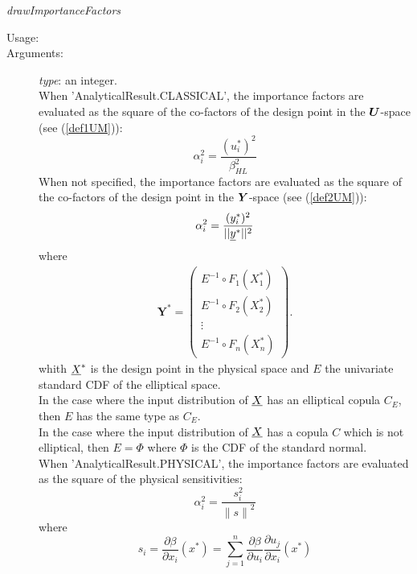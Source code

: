 \begin{description}
\begin{description}
\item \textit{drawImportanceFactors}
\begin{description}
\item[Usage:] \rule{0pt}{1em}
\item[Arguments:] \textit{type}: an integer.
\\When 'AnalyticalResult.CLASSICAL', the importance factors are evaluated as the square of the co-factors of the design point in the ${\boldsymbol{U}}$-space (see (\ref{def1UM})):
\begin{equation}\label{def1UM}
\alpha_i^2 = \displaystyle \frac{(u_i^{*})^2}{\beta_{HL}^2}
\end{equation}
When not specified, the importance factors are evaluated as the square of the co-factors of the design point in the ${\boldsymbol{Y}}$-space (see (\ref{def2UM})):
\begin{equation}\label{def2UM}
\alpha_i^2 = \displaystyle \frac{(y_i^{*})^2}{||{\underline{y}}^{*}||^2}
\end{equation}
where
\begin{eqnarray}
\boldsymbol{Y}^* =  \left(
\begin{array}{c}
E^{-1}\circ F_1(X_1^*) \\
E^{-1}\circ F_2(X_2^*) \\
\vdots \\
E^{-1}\circ F_n(X_n^*)
\end{array}
\right).\label{varY10}
\end{eqnarray}
whith ${\underline{X}}^*$ is the design point in the physical space and $E$ the univariate standard CDF of the elliptical space. \\
In the case where the input distribution of ${\underline{X}}$ has an elliptical copula $C_E$, then $E$ has the same type as  $C_E$.\\
In the case where the input distribution of ${\underline{X}}$ has a copula $C$ which is not elliptical, then  $E=\Phi$ where $\Phi$ is the CDF of the standard normal.
\\When 'AnalyticalResult.PHYSICAL', the importance factors are evaluated as the square of the physical sensitivities:
\begin{equation}\label{def3UM}
\alpha_i^2 = \displaystyle \frac{s_i^2}{{\|s\|}^2}
\end{equation}
where
\begin{equation}
s_i = \displaystyle \frac{\partial \beta}{\partial x_i} (x^*) = \sum_{j=1}^n \frac{\partial \beta}{\partial u_i} \frac{\partial u_j}{\partial x_i} (x^*)
\end{equation}


\end{description}
\end{description}
\end{description}
